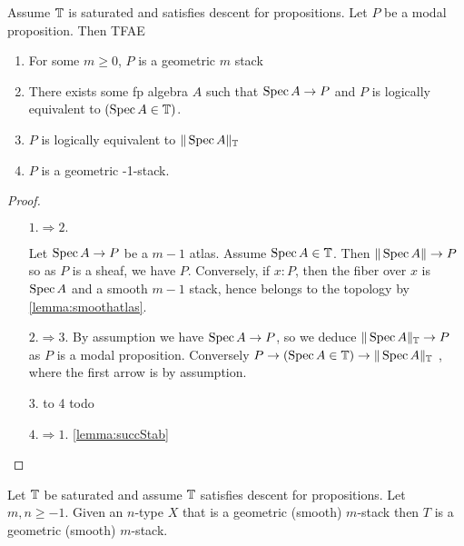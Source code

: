 \documentclass{article}
\newcommand{\red}[1]{{\color{red} #1}}
\begin{document}
\begin{lemma}{\label{lemma:prop0stacks}}
     Assume $\mathbb{T}$ is saturated and satisfies descent for propositions. Let $P$ be a modal proposition. Then TFAE 
     \begin{enumerate}
         \item For some $m \ge 0$, $P$ is a geometric $m$ stack 
         \item There exists some fp algebra $A$ such that $\operatorname{Spec} A \to P$ and $P$ is logically equivalent to $(\operatorname{Spec} A \in \mathbb{T})$.
         \item $P$ is logically equivalent to $\|\operatorname{Spec} A\|_{\mathbb{T}}$
         \item $P$ is a geometric -1-stack.
     \end{enumerate}
     
     
\end{lemma}
\begin{proof}
\
    \begin{itemize}
        \item[$1.\Rightarrow 2.$]
    
     Let $\operatorname{Spec} A \to P$ be a $m-1$ atlas. Assume $\operatorname{Spec} A \in \mathbb{T}$. Then $\|\operatorname{Spec} A\| \to P$ so as $P$ is a sheaf, we have $P$. Conversely, if $x : P$, then the fiber over $x$ is $\operatorname{Spec} A$ and a smooth $m-1$ stack, hence belongs to the topology by \ref{lemma:smoothatlas}. 
     \item[$2. \Rightarrow 3.$]
        By assumption we have $\operatorname{Spec} A \to P$, so we deduce $\|\operatorname{Spec} A\|_{\mathbb{T}} \to P$ as $P$ is a modal proposition. Conversely $P \to (\operatorname{Spec} A \in \mathbb{T}) \to \|\operatorname{Spec} A\|_{\mathbb{T}}$ , where the first arrow is by assumption.
        \item [3. to 4] todo
        \item [$4. \Rightarrow 1.$] \ref{lemma:succStab}
     \end{itemize}
\end{proof}
\begin{theorem}
    Let $\mathbb{T}$ be saturated and assume $\mathbb{T}$ satisfies descent for propositions. Let $m , n \ge -1$. Given an $n$-type $X$ that is a geometric (smooth) $m$-stack then $T$ is a geometric (smooth) $m$-stack.
\end{theorem}
\end{document}
